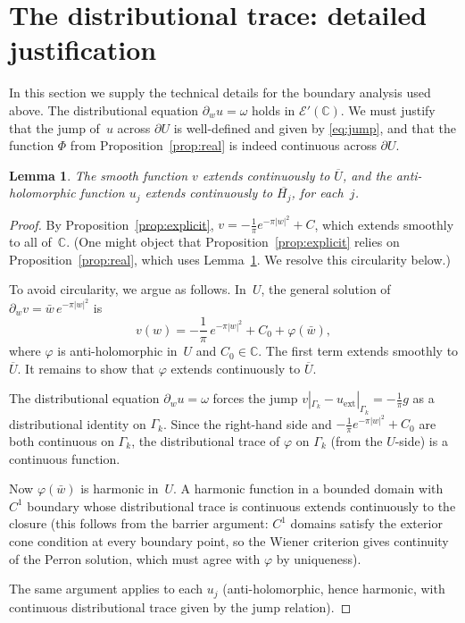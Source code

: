 \documentclass[11pt]{article}
\newtheorem{lemma}[theorem]{Lemma}
\newcommand{\C}{\mathbb C}
\newcommand{\1}{\mathbf 1}
\newcommand{\pw}{\partial_w}
\begin{document}
\section{The distributional trace: detailed justification}\label{sec:trace-details}

In this section we supply the technical details for the boundary analysis used above.
The distributional equation \(\pw u=\omega\) holds in \(\mathcal E'(\C)\). We must
justify that the jump of~\(u\) across \(\partial U\) is well-defined and given by
\eqref{eq:jump}, and that the function \(\Phi\) from Proposition~\ref{prop:real} is
indeed continuous across \(\partial U\).

\begin{lemma}\label{lem:boundary-reg}
The smooth function \(v\) extends continuously to \(\overline U\), and the anti-holomorphic
function \(u_j\) extends continuously to \(\overline{H_j}\), for each~\(j\).
\end{lemma}

\begin{proof}
By Proposition~\ref{prop:explicit}, \(v=-\frac1\pi e^{-\pi|w|^2}+C\), which extends
smoothly to all of~\(\C\). (One might object that Proposition~\ref{prop:explicit} relies
on Proposition~\ref{prop:real}, which uses Lemma~\ref{lem:boundary-reg}. We resolve this
circularity below.)

To avoid circularity, we argue as follows. In~\(U\), the general solution of
\(\pw v=\bar w\,e^{-\pi|w|^2}\) is
\[
v(w)=-\frac1\pi\,e^{-\pi|w|^2}+C_0+\varphi(\bar w),
\]
where \(\varphi\) is anti-holomorphic in~\(U\) and \(C_0\in\C\). The first term
extends smoothly to \(\overline U\). It remains to show that \(\varphi\) extends
continuously to \(\overline U\).

The distributional equation \(\pw u=\omega\) forces the jump
\(v|_{\Gamma_k}-u_{\mathrm{ext}}|_{\Gamma_k}=-\frac1\pi g\) as a distributional
identity on \(\Gamma_k\). Since the right-hand side and
\(-\frac1\pi e^{-\pi|w|^2}+C_0\) are both continuous on \(\Gamma_k\), the distributional
trace of \(\varphi\) on \(\Gamma_k\) (from the \(U\)-side) is a continuous function.

Now \(\varphi(\bar w)\) is harmonic in~\(U\). A harmonic function in a bounded domain
with \(C^1\) boundary whose distributional trace is continuous extends continuously to
the closure (this follows from the barrier argument: \(C^1\) domains satisfy the exterior
cone condition at every boundary point, so the Wiener criterion gives continuity of the
Perron solution, which must agree with \(\varphi\) by uniqueness).

The same argument applies to each \(u_j\) (anti-holomorphic, hence harmonic, with
continuous distributional trace given by the jump relation).
\end{proof}
\end{document}
